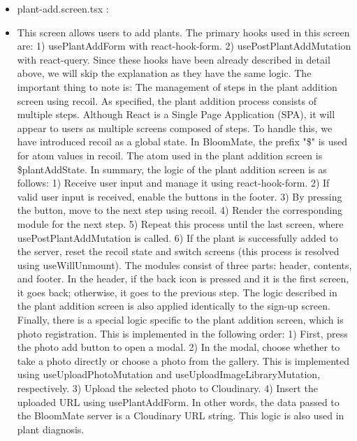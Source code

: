 \documentclass[conference, a4paper]{IEEEtran}
\begin{document}
\begin{enumerate}
\begin{enumerate}
\begin{itemize}
        \item plant-add.screen.tsx : 
        \item[] This screen allows users to add plants. The primary hooks used in this screen are: 1) usePlantAddForm with react-hook-form. 2) usePostPlantAddMutation with react-query. Since these hooks have been already described in detail above, we will skip the explanation as they have the same logic. The important thing to note is: The management of steps in the plant addition screen using recoil. As specified, the plant addition process consists of multiple steps. Although React is a Single Page Application (SPA), it will appear to users as multiple screens composed of steps. To handle this, we have introduced recoil as a global state. In BloomMate, the prefix "\$" is used for atom values in recoil. The atom used in the plant addition screen is \$plantAddState. In summary, the logic of the plant addition screen is as follows: 1) Receive user input and manage it using react-hook-form. 2) If valid user input is received, enable the buttons in the footer. 3) By pressing the button, move to the next step using recoil. 4) Render the corresponding module for the next step. 5) Repeat this process until the last screen, where usePostPlantAddMutation is called. 6) If the plant is successfully added to the server, reset the recoil state and switch screens (this process is resolved using useWillUnmount). The modules consist of three parts: header, contents, and footer. In the header, if the back icon is pressed and it is the first screen, it goes back; otherwise, it goes to the previous step. The logic described in the plant addition screen is also applied identically to the sign-up screen. Finally, there is a special logic specific to the plant addition screen, which is photo registration. This is implemented in the following order: 1) First, press the photo add button to open a modal. 2) In the modal, choose whether to take a photo directly or choose a photo from the gallery. This is implemented using useUploadPhotoMutation and useUploadImageLibraryMutation, respectively. 3) Upload the selected photo to Cloudinary. 4) Insert the uploaded URL using usePlantAddForm. In other words, the data passed to the BloomMate server is a Cloudinary URL string. This logic is also used in plant diagnosis. \\


\end{itemize}
\end{enumerate}
\end{enumerate}
\end{document}
